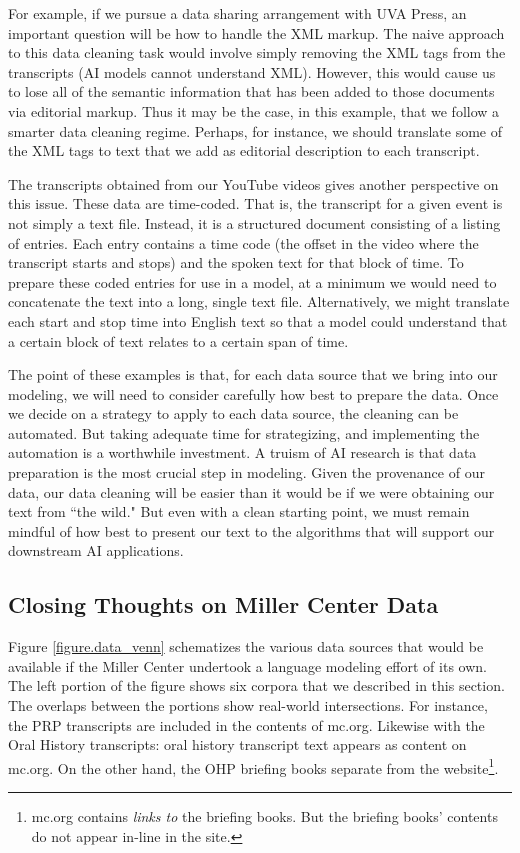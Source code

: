 \documentclass[12pt, oneside]{article}   	%
\begin{document}
For example, if we pursue a data sharing arrangement with UVA Press, an important question will be how to handle the XML markup.  The naive approach to this data cleaning task would involve simply removing the XML tags from the transcripts (AI models cannot understand XML).  However, this would cause us to lose all of the semantic information that has been added to those documents via editorial markup.  Thus it may be the case, in this example, that we follow a smarter data cleaning regime.  Perhaps, for instance, we should translate some of the XML tags to text that we add as editorial description to each transcript.  

The transcripts obtained from our YouTube videos gives another perspective on this issue.  These data are time-coded.  That is, the transcript for a given event is not simply a text file.  Instead, it is a structured document consisting of a listing of entries.  Each entry contains a time code (the offset in the video where the transcript starts and stops) and the spoken text for that block of time.  To prepare these coded entries for use in a model, at a minimum we would need to concatenate the text into a long, single text file.  Alternatively, we might translate each start and stop time into English text so that a model could understand that a certain block of text relates to a certain span of time.

The point of these examples is that, for each data source that we bring into our modeling, we will need to consider carefully how best to prepare the data.  Once we decide on a strategy to apply to each data source, the cleaning can be automated.  But taking adequate time for strategizing, and implementing the automation is a worthwhile investment.  A truism of AI research is that data preparation is the most crucial step in modeling.  Given the provenance of our data, our data cleaning will be easier than it would be if we were obtaining our text from ``the wild."  But even with a clean starting point, we must remain mindful of how best to present our text to the algorithms that will support our downstream AI applications.


\subsection{Closing Thoughts on Miller Center Data}\label{section.data.closing}
Figure \ref{figure.data_venn} schematizes the various data sources that would be available if the Miller Center undertook a language modeling effort of its own.  The left portion of the figure shows six corpora that we described in this section.  The overlaps between the portions show real-world intersections.  For instance, the PRP transcripts are  included in the contents of mc.org.  Likewise with the Oral History transcripts: oral history transcript text appears as content on mc.org.  On the other hand, the OHP briefing books separate from the website\footnote{mc.org contains \emph{links to} the briefing books.  But the briefing books' contents do not appear in-line in the site.}.
\end{document}
